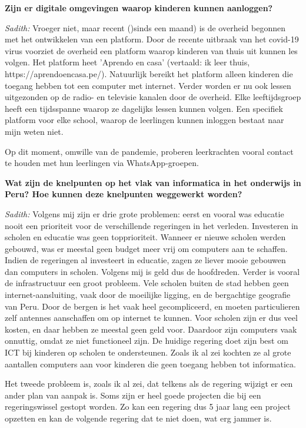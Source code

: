 \textbf{Zijn er digitale omgevingen waarop kinderen kunnen aanloggen?}

\textit{Sadith:} Vroeger niet, maar recent ()sinds een maand) is de overheid begonnen met het ontwikkelen van een platform. Door de recente uitbraak van het covid-19 virus voorziet de overheid een platform waarop kinderen van thuis uit kunnen les volgen. Het platform heet 'Aprendo en casa' (vertaald: ik leer thuis, https://aprendoencasa.pe/). Natuurlijk bereikt het platform alleen kinderen die toegang hebben tot een computer met internet. Verder worden er nu ook lessen uitgezonden op de radio- en televisie kanalen door de overheid. Elke leeftijdsgroep heeft een tijdsspanne waarop ze dagelijks lessen kunnen volgen. Een specifiek platform voor elke school, waarop de leerlingen kunnen inloggen bestaat naar mijn weten niet. 

Op dit moment, omwille van de pandemie, proberen leerkrachten vooral contact te houden met hun leerlingen via WhatsApp-groepen.

\textbf{Wat zijn de knelpunten op het vlak van informatica in het onderwijs in Peru? Hoe kunnen deze knelpunten weggewerkt worden?}

\textit{Sadith:} Volgens mij zijn er drie grote problemen: eerst en vooral was educatie nooit een prioriteit voor de verschillende regeringen in het verleden. Investeren in scholen en educatie was geen topprioriteit. Wanneer er nieuwe scholen werden gebouwd, was er meestal geen budget meer vrij om computers aan te schaffen. Indien de regeringen al investeert in educatie, zagen ze liever mooie gebouwen dan computers in scholen. Volgens mij is geld dus de hoofdreden. Verder is vooral de infrastructuur een groot probleem. Vele scholen buiten de stad hebben geen internet-aansluiting, vaak door de moeilijke ligging, en de bergachtige geografie van Peru. Door de bergen is het vaak heel gecompliceerd, en moeten particulieren zelf antennes aanschaffen om op internet te kunnen. Voor scholen zijn er dus veel kosten, en daar hebben ze meestal geen geld voor. Daardoor zijn computers vaak onnuttig, omdat ze niet functioneel zijn. De huidige regering doet zijn best om ICT bij kinderen op scholen te ondersteunen. Zoals ik al zei kochten ze al grote aantallen computers aan voor kinderen die geen toegang hebben tot informatica.

Het tweede probleem is, zoals ik al zei, dat telkens als de regering wijzigt er een ander plan van aanpak is. Soms zijn er heel goede projecten die bij een regeringswissel gestopt worden. Zo kan een regering dus 5 jaar lang een project opzetten en kan de volgende regering dat te niet doen, wat erg jammer is. 

